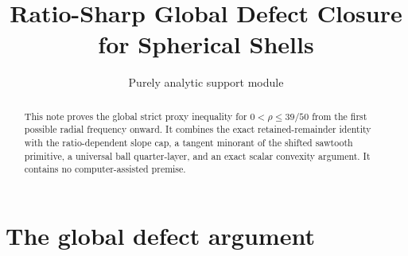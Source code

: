 \documentclass[11pt]{article}
\title{Ratio-Sharp Global Defect Closure for Spherical Shells}
\author{}
\date{Purely analytic support module}
\theoremstyle{remark}
\begin{document}
\maketitle

\begin{abstract}
This note proves the global strict proxy inequality for
$0<\rho\leq39/50$ from the first possible radial frequency onward.  It
combines the exact retained-remainder identity with the ratio-dependent
slope cap, a tangent minorant of the shifted sawtooth primitive, a universal
ball quarter-layer, and an exact scalar convexity argument.  It contains no
computer-assisted premise.
\end{abstract}

\section{The global defect argument}


\end{document}
